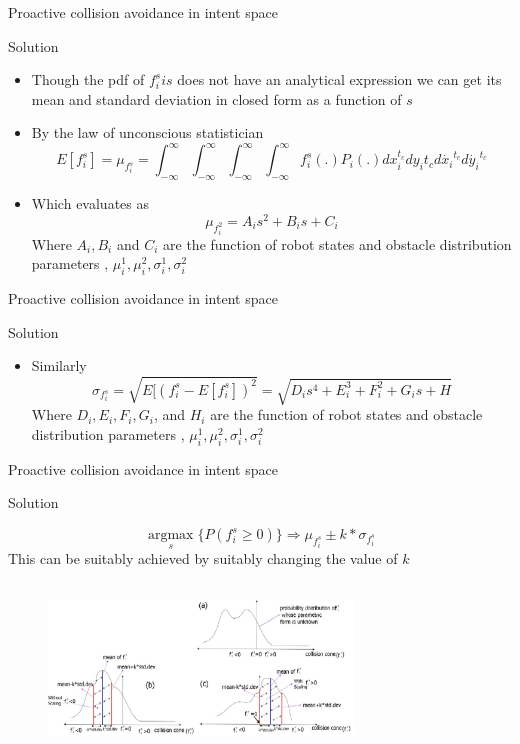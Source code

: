 \documentclass{beamer}
\begin{document}
\begin{frame}{Proactive collision avoidance in intent space}


\begin{block}{Solution}
\begin{itemize}


\item{Though the pdf of $f_i^s is$ does not have an analytical expression we can get its mean and standard deviation in closed form as a function of $s$}
\item{By the law of unconscious statistician}
$$E[f_i^s]=\mu_{f_i^s}=\int_{-\infty}^{\infty}\int_{-\infty}^{\infty}\int_{-\infty}^{\infty}
\int_{-\infty}^{\infty}f_i^s(.)P_i(.)dx_i^{t_c}dy_i{t_c}d\dot{x_i}^{t_c}d\dot{y_i}^{t_c}$$
\item{Which evaluates as}
$$\mu_{f_i^2} = A_is^2+B_is+C_i$$
Where $A_i,B_i$ and $C_i$ are the function of robot states and obstacle distribution parameters , $\mu_i^1,\mu_i^2,\sigma_i^1,\sigma_i^2$
 \end{itemize} 
\end{block}
\end{frame}
\begin{frame}{Proactive collision avoidance in intent space}


\begin{block}{Solution}
\begin{itemize}


\item{Similarly}
$$ \sigma_{f_i^s} = \sqrt{E[(f_i^s - E[f_i^s])^2} = 
\sqrt{D_is^4+E_i^3+F_i^2+G_is+H}$$
Where $D_i,E_i,F_i,G_i$, and $H_i$ are the function of robot states and obstacle distribution parameters , $\mu_i^1,\mu_i^2,\sigma_i^1,\sigma_i^2$
 \end{itemize} 
\end{block}
\end{frame}
\begin{frame}{Proactive collision avoidance in intent space}
\begin{block}{Solution}

$$\underset{s}{\operatorname{argmax}}\{P(f_i^s \geq 0)\} \Longrightarrow \mu_{f_i^s} \pm k * \sigma_{f_i^s} $$ 
This can be suitably achieved by suitably changing the value of $k$
\begin{figure}
\includegraphics[width= 8.1cm, height=4.5cm]{coll_cone_distribution.eps}
\end{figure}
\end{block}
\end{frame}
\end{document}
